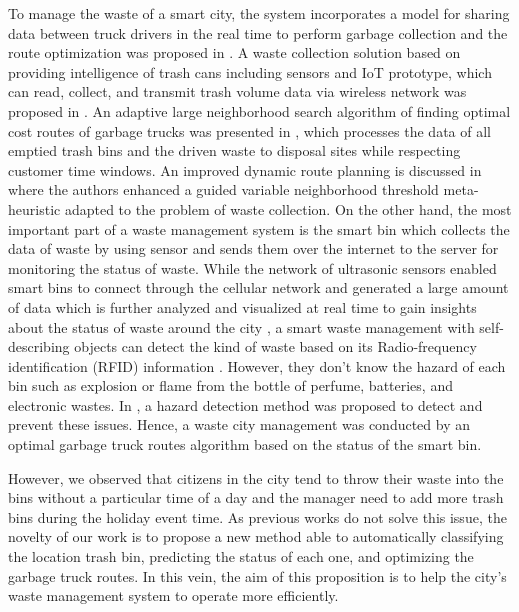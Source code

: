 \documentclass[conference]{IEEEtran}
\begin{document}
\par To manage the waste of a smart city, the system incorporates a model for sharing data between truck drivers in the real time to perform garbage collection and the route optimization was proposed in \cite{Medvedev2015}. A waste collection solution based on providing intelligence of trash cans including sensors and IoT prototype, which can read, collect, and transmit trash volume data via wireless network was proposed in \cite{Gutierreza2015}\cite{Hong2014}. An adaptive large neighborhood search algorithm of finding optimal cost routes of garbage trucks was presented in \cite{Buhrkala212}, which processes the data of all emptied trash bins and the driven waste to disposal sites while respecting customer time windows. An improved dynamic route planning is discussed in \cite{Nuorito2006} where the authors enhanced a guided variable neighborhood threshold meta-heuristic adapted to the problem of waste collection. On the other hand, the most important part of a waste management system is the smart bin \cite{Sharma2015}\cite{Glouche2013}\cite{Sinhan2013} which collects the data of waste by using sensor and sends them over the internet to the server for monitoring the status of waste. While the network of ultrasonic sensors enabled smart bins to connect through the cellular network and generated a large amount of data which is further analyzed and visualized at real time to gain insights about the status of waste around the city \cite{Sharma2015}, a smart waste management with self-describing objects can detect the kind of waste based on its Radio-frequency identification (RFID) information \cite{Glouche2013}. However, they don't know the hazard of each bin such as explosion or flame from the bottle of perfume, batteries, and electronic wastes. In \cite{Sinhan2013}, a hazard detection method was proposed to detect and prevent these issues. Hence, a waste city management was conducted by an optimal garbage truck routes algorithm based on the status of the smart bin. 

However, we observed that citizens in the city tend to throw their waste into the bins without a particular time of a day and the manager need to add more trash bins during the holiday event time. As previous works do not solve this issue, the novelty of our work is to propose a new method able to automatically classifying the location trash bin, predicting the status of each one, and optimizing the garbage truck routes. In this vein, the aim of this proposition is to help the city’s waste management system to operate more efficiently. 
\end{document}
